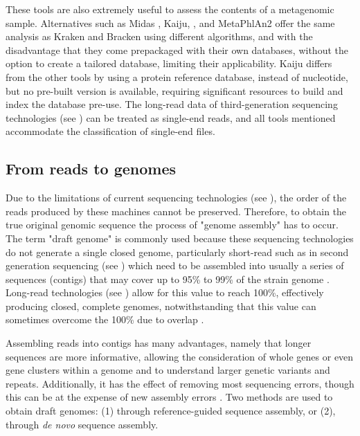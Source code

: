 These tools are also extremely useful to assess the contents of a metagenomic sample. Alternatives such as Midas \citep{nayfach_integrated_2016}, Kaiju, \citep{menzel_fast_2016}, and MetaPhlAn2 \citep{truong_metaphlan2_2015} offer the same analysis as Kraken and Bracken using different algorithms, and with the disadvantage that they come prepackaged with their own databases, without the option to create a tailored database, limiting their applicability. Kaiju differs from the other tools by using a protein reference database, instead of nucleotide, but no pre-built version is available, requiring significant resources to build and index the database pre-use. The long-read data of third-generation sequencing technologies (see ) can be treated as single-end reads, and all tools mentioned accommodate the classification of single-end files. 

\subsection{From reads to genomes} \label{ssec:reads_2_genomes}

Due to the limitations of current sequencing technologies (see ), the order of the reads produced by these machines cannot be preserved. 
Therefore, to obtain the true original genomic sequence the process of "genome assembly" has to occur. 
The term "draft genome" is commonly used because these sequencing technologies do not generate a single closed genome, particularly short-read such as in second generation sequencing (see ) which need to be assembled into usually a series of sequences (contigs) that may cover up to 95\% to 99\% of the strain genome \citep{carrico_primer_2018}. 
Long-read technologies (see ) allow for this value to reach 100\%, effectively producing closed, complete genomes, notwithstanding that this value can sometimes overcome the 100\% due to overlap \citep{wick_benchmarking_2021}. 

Assembling reads into contigs has many advantages, namely that longer sequences are more informative, allowing the consideration of whole genes or even gene clusters within a genome and to understand larger genetic variants and repeats. Additionally, it has the effect of removing most sequencing errors, though this can be at the expense of new assembly errors \citep{ayling_new_2020}. Two methods are used to obtain draft genomes: (1) through reference-guided sequence assembly, or (2), through \textit{de novo} sequence assembly.

